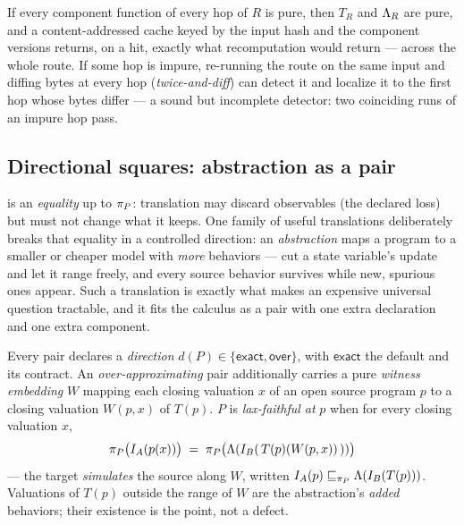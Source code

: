 \begin{proposition}
\label{prop:cache}
If every component function of every hop of $R$ is pure, then $T_R$ and
$\Lambda_R$ are pure, and a content-addressed cache keyed by the input
hash and the component versions returns, on a hit, exactly what
recomputation would return --- across the whole route. If some hop is
impure, re-running the route on the same input and
diffing bytes at every hop (\emph{twice-and-diff}) can detect it and
localize it to the first hop whose bytes differ --- a sound but
incomplete detector: two coinciding runs of an impure hop pass.
\end{proposition}

\ifarxiv
\subsection{Directional squares: abstraction as a pair}
\label{sec:lax}

 is an \emph{equality} up to $\pi_P$: translation
may discard observables (the declared loss) but must not change what it
keeps. One family of useful translations deliberately breaks that
equality in a controlled direction: an \emph{abstraction} maps a program
to a smaller or cheaper model with \emph{more} behaviors --- cut a state
variable's update and let it range freely, and every source behavior
survives while new, spurious ones appear. Such a translation is exactly
what makes an expensive universal question tractable, and it fits the
calculus as a pair with one extra declaration and one extra component.

\begin{definition}
\label{def:lax}
Every pair declares a \emph{direction}
$d(P) \in \{\mathsf{exact}, \mathsf{over}\}$, with
$\mathsf{exact}$ the default and  its contract. An
\emph{over-approximating} pair additionally carries a pure
\emph{witness embedding} $W$ mapping each closing valuation $x$ of an
open source program $p$ to a closing valuation $W(p,x)$ of $T(p)$. $P$
is \emph{lax-faithful at} $p$ when for every closing valuation $x$,
\[
\pi_P\bigl(I_A(p(x))\bigr) \;=\;
\pi_P\bigl(\Lambda(I_B(\,T(p)(W(p,x))\,))\bigr)
\]
--- the target \emph{simulates} the source along $W$, written
$I_A(p) \sqsubseteq_{\pi_P} \Lambda(I_B(T(p)))$. Valuations of $T(p)$
outside the range of $W$ are the abstraction's \emph{added} behaviors;
their existence is the point, not a defect.
\end{definition}

